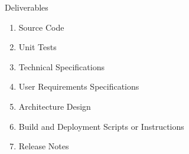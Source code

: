 \newline
\Large Deliverables
\small
\begin{enumerate}
\item Source Code
\item Unit Tests
\item Technical Specifications
\item User Requirements Specifications
\item Architecture Design
\item Build and Deployment Scripts or Instructions 
\item Release Notes
\end{enumerate}
